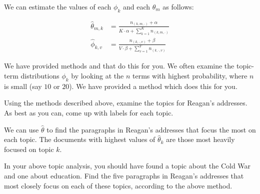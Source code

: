 We can estimate the values of each $\phi_{k}$ and each $\theta_{m}$ as follows:

\begin{align*}
\widehat{\theta}_{m,k} & = \frac{n_{(k,m,\cdot)} + \alpha}{K \cdot \alpha + \sum_{k=1}^{K} n_{(k,m,\cdot)}} \\
\widehat{\phi}_{k,v} & = \frac{n_{(k,\cdot,v)} + \beta}{V \cdot \beta + \sum_{v=1}^{V} n_{(k,\cdot,v)}}
\end{align*}

We have provided methods  and  that do this for you. We often examine the topic-term distributions $\phi_{k}$ by looking at the $n$ terms with highest probability, where $n$ is small (say $10$ or $20$).  We have provided a method  which does this for you.

\begin{problem}
Using the methods described above, examine the topics for Reagan's addresses. As best as you can, come up with labels for each topic.
\end{problem}

We can use $\widehat{\theta}$ to find the paragraphs in Reagan's addresses that focus the most on each topic. The documents with highest values of $\widehat{\theta}_{k}$ are those most heavily focused on topic $k$.

\begin{problem}
In your above topic analysis, you should have found a topic about the Cold War and one about education. Find the five paragraphs in Reagan's addresses that most closely focus on each of these topics, according to the above method.
\end{problem}
